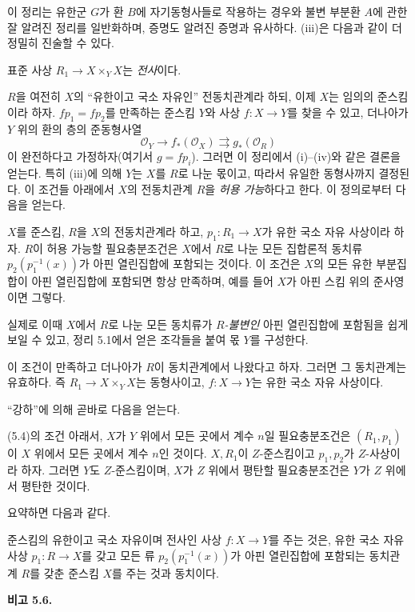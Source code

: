 이 정리는 유한군 $G$가 환 $B$에 자기동형사들로 작용하는 경우와 불변
부분환 $A$에 관한 잘 알려진 정리를 일반화하며, 증명도 알려진
증명과 유사하다. (iii)은 다음과 같이 더 정밀히 진술할 수 있다.

 표준 사상 $R_1\to X\times_Y X$는 \emph{전사}이다.

$R$을 여전히 $X$의 “유한이고 국소 자유인” 전동치관계라 하되, 이제
$X$는 임의의 준스킴이라 하자. $fp_1=fp_2$를 만족하는 준스킴 $Y$와
사상 $f:X\to Y$를 찾을 수 있고, 더나아가 $Y$ 위의 환의 층의
준동형사열
\[
  \mathcal O_Y\longrightarrow f_*(\mathcal O_X)
  \rightrightarrows g_*(\mathcal O_R)
\]
이 완전하다고 가정하자(여기서 $g=fp_i$). 그러면 이 정리에서 (i)--(iv)와
같은 결론을 얻는다. 특히 (iii)에 의해 $Y$는 $X$를 $R$로 나눈
몫이고, 따라서 유일한 동형사까지 결정된다. 이 조건들 아래에서
$X$의 전동치관계 $R$을 \emph{허용 가능}하다고 한다. 이 정의로부터
다음을 얻는다.

 $X$를 준스킴, $R$을 $X$의 전동치관계라 하고,
$p_1:R_1\to X$가 유한 국소 자유 사상이라 하자. $R$이 허용 가능할
필요충분조건은 $X$에서 $R$로 나눈 모든 집합론적 동치류
$p_2(p_1^{-1}(x))$가 아핀 열린집합에 포함되는 것이다. 이 조건은
$X$의 모든 유한 부분집합이 아핀 열린집합에 포함되면 항상 만족하며,
예를 들어 $X$가 아핀 스킴 위의 준사영이면 그렇다.

실제로 이때 $X$에서 $R$로 나눈 모든 동치류가 \emph{$R$-불변인}
아핀 열린집합에 포함됨을 쉽게 보일 수 있고, 정리 5.1에서 얻은
조각들을 붙여 몫 $Y$를 구성한다.

 이 조건이 만족하고 더나아가 $R$이 동치관계에서
나왔다고 하자. 그러면 그 동치관계는 유효하다. 즉
$R_1\to X\times_Y X$는 동형사이고, $f:X\to Y$는 유한 국소 자유
사상이다.

“강하”에 의해 곧바로 다음을 얻는다.

 (5.4)의 조건 아래서, $X$가 $Y$ 위에서 모든
곳에서 계수 $n$일 필요충분조건은 $(R_1,p_1)$이 $X$ 위에서 모든 곳에서
계수 $n$인 것이다. $X,R_1$이 $Z$-준스킴이고 $p_1,p_2$가
$Z$-사상이라 하자. 그러면 $Y$도 $Z$-준스킴이며, $X$가 $Z$
위에서 평탄할 필요충분조건은 $Y$가 $Z$ 위에서 평탄한 것이다.

요약하면 다음과 같다.

 준스킴의 유한이고 국소 자유이며 전사인 사상
$f:X\to Y$를 주는 것은, 유한 국소 자유 사상 $p_1:R\to X$를
갖고 모든 류 $p_2(p_1^{-1}(x))$가 아핀 열린집합에 포함되는 동치관계
$R$를 갖춘 준스킴 $X$를 주는 것과 동치이다.

\medskip
\noindent\textbf{비고 5.6.}

